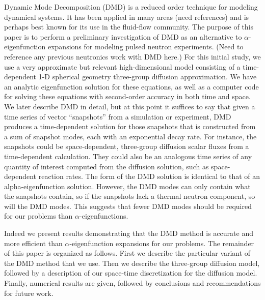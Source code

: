 \documentclass[12pt]{article}
\begin{document}
Dynamic Mode Decomposition (DMD) is a reduced order technique for modeling   dynamical systems.  
It has been applied in many areas (need references) and is perhaps best known 
 for its use in the fluid-flow community.  
The purpose of this paper is to perform a preliminary investigation of DMD as 
 an alternative to $\alpha$-eigenfunction expansions for modeling pulsed 
 neutron experiments. (Need to reference any previous neutronics work with DMD here.) 
For this initial study, we use a very approximate but relevant high-dimensional 
 model consisting of a time-dependent 1-D spherical geometry three-group diffusion approximation. 
We have an analytic eigenfunction solution for these equations, as well as a 
 computer code for solving these equations with second-order accuracy in both time and space.  
We later describe DMD in detail, but at this point it suffices to say that 
 given a time series of vector ``snapshots'' from a simulation or experiment, 
 DMD produces a time-dependent solution for those snapshots that is constructed 
 from a sum of snapshot modes, each with an exponential decay rate.  
For instance, the snapshots could be space-dependent, three-group diffusion 
 scalar fluxes from a time-dependent calculation.  
They could also be an analogous time series of any quantity of interest 
 computed from the diffusion solution, such as space-dependent reaction rates.  
The form of the DMD solution is identical to that of an alpha-eigenfunction  solution.  
However, the DMD modes can only contain what the snapshots contain, so if the 
 snapshots lack a thermal neutron component, so will the DMD modes.  
This suggests that fewer DMD modes should be required for our problems than   $\alpha$-eigenfunctions.

Indeed we present results demonstrating that the DMD method is accurate and 
 more efficient than $\alpha$-eigenfunction expansions for our problems.  
The remainder of this paper is organized as follows.  
First we describe the particular variant of the DMD method that we use.  
Then we describe the three-group diffusion model, followed by a description of 
 our space-time discretization for the diffusion model.  
Finally, numerical results are given, followed by conclusions and   recommendations for future work.
\end{document}
